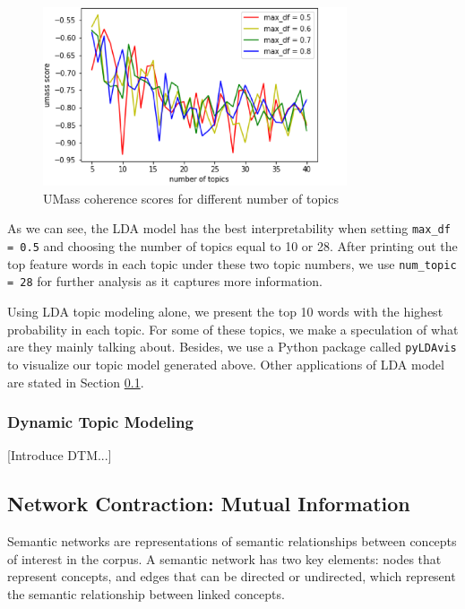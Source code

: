 \documentclass[final,authoryear,3p,12pt,times,hidelinks]{elsarticle}
\begin{document}
\begin{figure}[ht!]
  \begin{center}
    \includegraphics[width=0.8\textwidth]{graphs/umass_coherence_num_topics.png}
    \caption{UMass coherence scores for different number of topics}
    \label{fig:umass coherence num topics}
  \end{center}
\end{figure}

As we can see, the LDA model has the best interpretability when setting \texttt{max\_df = 0.5} and choosing the number of topics equal to 10 or 28. After printing out the top feature words in each topic under these two topic numbers, we use \texttt{num\_topic = 28} for further analysis as it captures more information. 

Using LDA topic modeling alone, we present the top 10 words with the highest probability in each topic. For some of these topics, we make a speculation of what are they mainly talking about. Besides, we use a Python package called \texttt{pyLDAvis} to visualize our topic model generated above. Other applications of LDA model are stated in Section \ref{sec:Network Contraction}.


\subsubsection{Dynamic Topic Modeling}
\label{subsec:DTM}
[Introduce DTM...]



\subsection{Network Contraction: Mutual Information}
\label{sec:Network Contraction}
Semantic networks are representations of semantic relationships between concepts of interest in the corpus. A semantic network has two key elements: nodes that represent concepts, and edges that can be directed or undirected, which represent the semantic relationship between linked concepts. 
\end{document}
